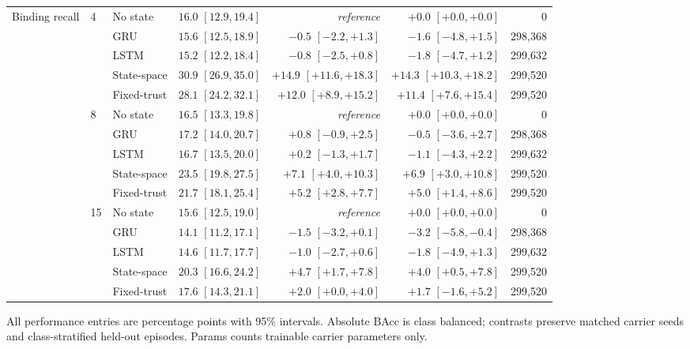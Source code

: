 {\begin{table}[H]
\begin{tabular}{lllrrrr}
\midrule
\addlinespace[1pt]
Binding recall & 4 & No state & $16.0$ $[12.9,19.4]$ & \textit{reference} & $+0.0$ $[+0.0,+0.0]$ & 0 \\
 &  & GRU & $15.6$ $[12.5,18.9]$ & $-0.5$ $[-2.2,+1.3]$ & $-1.6$ $[-4.8,+1.5]$ & 298{,}368 \\
 &  & LSTM & $15.2$ $[12.2,18.4]$ & $-0.8$ $[-2.5,+0.8]$ & $-1.8$ $[-4.7,+1.2]$ & 299{,}632 \\
 &  & State-space & $30.9$ $[26.9,35.0]$ & $+14.9$ $[+11.6,+18.3]$ & $+14.3$ $[+10.3,+18.2]$ & 299{,}520 \\
 &  & Fixed-trust & $28.1$ $[24.2,32.1]$ & $+12.0$ $[+8.9,+15.2]$ & $+11.4$ $[+7.6,+15.4]$ & 299{,}520 \\
\addlinespace[1pt]
 & 8 & No state & $16.5$ $[13.3,19.8]$ & \textit{reference} & $+0.0$ $[+0.0,+0.0]$ & 0 \\
 &  & GRU & $17.2$ $[14.0,20.7]$ & $+0.8$ $[-0.9,+2.5]$ & $-0.5$ $[-3.6,+2.7]$ & 298{,}368 \\
 &  & LSTM & $16.7$ $[13.5,20.0]$ & $+0.2$ $[-1.3,+1.7]$ & $-1.1$ $[-4.3,+2.2]$ & 299{,}632 \\
 &  & State-space & $23.5$ $[19.8,27.5]$ & $+7.1$ $[+4.0,+10.3]$ & $+6.9$ $[+3.0,+10.8]$ & 299{,}520 \\
 &  & Fixed-trust & $21.7$ $[18.1,25.4]$ & $+5.2$ $[+2.8,+7.7]$ & $+5.0$ $[+1.4,+8.6]$ & 299{,}520 \\
\addlinespace[1pt]
 & 15 & No state & $15.6$ $[12.5,19.0]$ & \textit{reference} & $+0.0$ $[+0.0,+0.0]$ & 0 \\
 &  & GRU & $14.1$ $[11.2,17.1]$ & $-1.5$ $[-3.2,+0.1]$ & $-3.2$ $[-5.8,-0.4]$ & 298{,}368 \\
 &  & LSTM & $14.6$ $[11.7,17.7]$ & $-1.0$ $[-2.7,+0.6]$ & $-1.8$ $[-4.9,+1.3]$ & 299{,}632 \\
 &  & State-space & $20.3$ $[16.6,24.2]$ & $+4.7$ $[+1.7,+7.8]$ & $+4.0$ $[+0.5,+7.8]$ & 299{,}520 \\
 &  & Fixed-trust & $17.6$ $[14.3,21.1]$ & $+2.0$ $[+0.0,+4.0]$ & $+1.7$ $[-1.6,+5.2]$ & 299{,}520 \\
\bottomrule
\end{tabular}
\vspace{2pt}
\parbox{0.98\textwidth}{\scriptsize All performance entries are percentage points with 95\% intervals. Absolute BAcc is class balanced; contrasts preserve matched carrier seeds and class-stratified held-out episodes. Params counts trainable carrier parameters only.}
\end{table}

}

